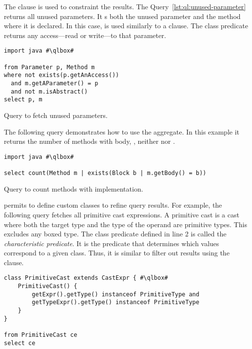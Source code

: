 The  clause is used to constraint the results.
The Query~\ref{lst:ql:unused-parameter} returns all unused parameters.
It s both the unused parameter and the method where it is declared.
In this case,  is used similarly to a \sql{}  clause.
The  class predicate returns any access---read or write---to that parameter.

\begin{listing}
\begin{verbatim}
import java #\qlbox#

from Parameter p, Method m
where not exists(p.getAnAccess())
  and m.getAParameter() = p
  and not m.isAbstract()
select p, m
\end{verbatim}
\caption{Query to fetch unused parameters.}
\label{lst:ql:unused-parameter}
\end{listing}


The following query demonstrates how to use the  aggregate.
In this example it returns the number of methods with body,
\ie{}, neither  nor .

\begin{listing}
\begin{verbatim}
import java #\qlbox#

select count(Method m | exists(Block b | m.getBody() = b))
\end{verbatim}
\caption{Query to count methods with implementation.}
\label{lst:ql:count}
\end{listing}

\ql{} permits to define custom classes to refine query results. 
For example, the following query fetches all primitive cast expressions.
A primitive cast is a cast where both the target type and the type of the operand are primitive types.
This excludes any boxed type.
The class predicate defined in line 2 is called the \emph{characteristic predicate}.
It is the predicate that determines which values correspond to a given class.
Thus, it is similar to filter out results using the  clause.

\begin{listing}
\begin{verbatim}
class PrimitiveCast extends CastExpr { #\qlbox#
	PrimitiveCast() {
		getExpr().getType() instanceof PrimitiveType and
		getTypeExpr().getType() instanceof PrimitiveType
	}
}

from PrimitiveCast ce
select ce
\end{verbatim}
\end{listing}

